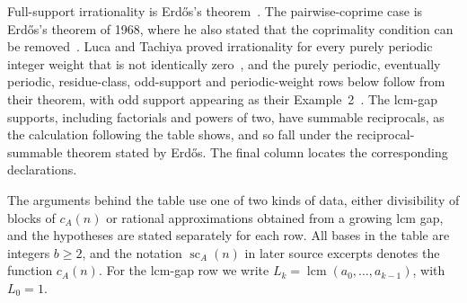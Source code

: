 Full-support irrationality is Erd\H{o}s's theorem~\cite{erdos1948}.  The
pairwise-coprime case is Erd\H{o}s's theorem of 1968, where he also stated that
the coprimality condition can be removed~\cite[p.~222]{erdos1968}.  Luca and
Tachiya proved irrationality for every purely periodic integer weight that is
not identically zero~\cite[Theorem~A, p.~139]{lucatachiya2017}, and the purely
periodic, eventually periodic, residue-class, odd-support and periodic-weight
rows below follow from their theorem, with odd support appearing as their
Example~2~\cite[p.~140]{lucatachiya2017}. The lcm-gap supports, including
factorials and powers of two, have summable reciprocals, as the calculation
following the table shows, and so fall under the reciprocal-summable theorem
stated by Erd\H{o}s. The final column locates the corresponding
declarations.

The arguments behind the table use one of two kinds of data, either
divisibility of blocks of $c_A(n)$ or rational approximations obtained
from a growing lcm gap, and the hypotheses are stated separately for each
row. All bases in the table are integers $b\ge2$, and the notation
$\operatorname{sc}_A(n)$ in later source excerpts denotes the function
$c_A(n)$. For the lcm-gap row we write
$L_k=\operatorname{lcm}(a_0,\ldots,a_{k-1})$, with $L_0=1$.

